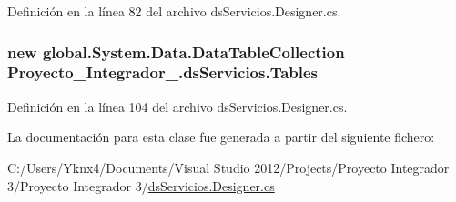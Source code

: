 Definición en la línea 82 del archivo ds\-Servicios.\-Designer.\-cs.

\hypertarget{class_proyecto___integrador__3_1_1ds_servicios_a2b08d569f4f435957a1f10b46c304cb2}{
\subsubsection[{Tables}]{\setlength{\rightskip}{0pt plus 5cm}new global.\-System.\-Data.\-Data\-Table\-Collection Proyecto\-\_\-\-Integrador\-\_.\-ds\-Servicios.\-Tables\hspace{0.3cm}{\ttfamily [get]}}}\label{class_proyecto___integrador__3_1_1ds_servicios_a2b08d569f4f435957a1f10b46c304cb2}


Definición en la línea 104 del archivo ds\-Servicios.\-Designer.\-cs.



La documentación para esta clase fue generada a partir del siguiente fichero\-:\begin{DoxyCompactItemize}
\item 
C\-:/\-Users/\-Yknx4/\-Documents/\-Visual Studio 2012/\-Projects/\-Proyecto Integrador 3/\-Proyecto Integrador 3/\hyperlink{ds_servicios_8_designer_8cs}{ds\-Servicios.\-Designer.\-cs}\end{DoxyCompactItemize}
